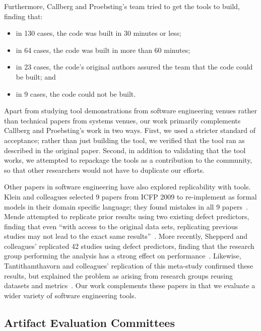 \documentclass[10pt,conference]{IEEEtran}
\begin{document}
\noindent
Furthermore, Callberg and Proebsting's team tried to get the tools to build, finding
that:

\begin{itemize} 
\item in 130 cases, the code was built in 30 minutes or less;
\item in 64 cases, the code was built in more than 60 minutes;
\item in 23 cases, the code's original authors assured the team that the code could be
			built; and
\item in 9 cases, the code could not be built.
\end{itemize}

\noindent
Apart from studying tool demonstrations from software engineering venues
rather than technical papers from systems venues,
our work primarily complements Callberg and Proebsting's work in two
ways.
First, we used a stricter standard of acceptance; rather than just building
the tool, we verified that the tool ran as described in the original paper.
Second, in addition to validating that the tool works, we attempted to 
repackage the tools as a contribution to the community, so that other
researchers would not have to duplicate our efforts. 

Other papers in software engineering have also explored 
replicability with tools.
Klein and colleagues selected 9 papers from ICFP 2009 to
re-implement as formal models in their domain specific language;
they found mistakes in all 9 papers~\cite{klein2012run}.
Mende attempted to replicate prior results using two 
existing defect predictors, finding that even
``with access to the original data sets, replicating
previous studies may not lead to the exact same results''~\cite{mende2010replication}.
More recently, Shepperd and colleagues' replicated 42 studies 
using defect predictors, finding that the research group 
performing the analysis has a strong effect on performance~\cite{shepperd}.
Likewise, Tantithamthavorn and colleagues' replication of this meta-study
confirmed these results, but explained the problem as arising from 
research groups reusing datasets and metrics~\cite{tantithamthavorn}.
Our work complements these papers in that we evaluate a wider
variety of software engineering tools.

\subsection{Artifact Evaluation Committees}
\end{document}
